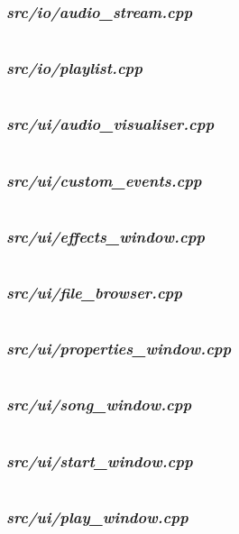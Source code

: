 \subsubsection {\textit{src/io/audio\_stream.cpp}}
\inputminted[linenos]{c++}{../src/io/audio_stream.cpp}
\pagebreak
\subsubsection {\textit{src/io/playlist.cpp}}
\inputminted[linenos]{c++}{../src/io/playlist.cpp}
\pagebreak
\subsubsection {\textit{src/ui/audio\_visualiser.cpp}}
\inputminted[linenos]{c++}{../src/ui/audio_visualiser.cpp}
\pagebreak
\subsubsection {\textit{src/ui/custom\_events.cpp}}
\inputminted[linenos]{c++}{../src/ui/custom_events.cpp}
\pagebreak
\subsubsection {\textit{src/ui/effects\_window.cpp}}
\inputminted[linenos]{c++}{../src/ui/effects_window.cpp}
\pagebreak
\subsubsection {\textit{src/ui/file\_browser.cpp}}
\inputminted[linenos]{c++}{../src/ui/file_browser.cpp}
\pagebreak
\subsubsection {\textit{src/ui/properties\_window.cpp}}
\inputminted[linenos]{c++}{../src/ui/properties_window.cpp}
\pagebreak
\subsubsection {\textit{src/ui/song\_window.cpp}}
\inputminted[linenos]{c++}{../src/ui/song_window.cpp}
\pagebreak
\subsubsection {\textit{src/ui/start\_window.cpp}}
\inputminted[linenos]{c++}{../src/ui/start_window.cpp}
\pagebreak
\subsubsection {\textit{src/ui/play\_window.cpp}}
\inputminted[linenos]{c++}{../src/ui/play_window.cpp}
\pagebreak
